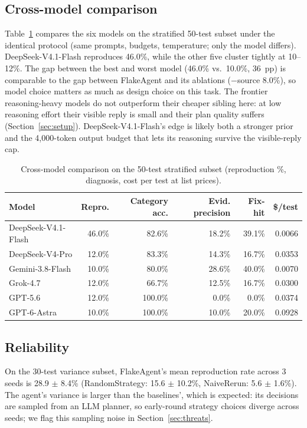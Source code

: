 \subsection{Cross-model comparison}

Table~\ref{tab:models-results} compares the six models on the stratified
50-test subset under the identical protocol (same prompts, budgets,
temperature; only the model differs). DeepSeek-V4.1-Flash reproduces 46.0\%,
while the other five cluster tightly at 10--12\%. The gap between the best
and worst model (46.0\% vs.\ 10.0\%, 36~pp) is comparable to the gap between
FlakeAgent and its ablations ($-$source 8.0\%), so model choice matters as
much as design choice on this task. The frontier reasoning-heavy models do
not outperform their cheaper sibling here: at low reasoning effort their
visible reply is small and their plan quality suffers
(Section~\ref{sec:setup}). DeepSeek-V4.1-Flash's edge is likely both a
stronger prior and the 4{,}000-token output budget that lets its reasoning
survive the visible-reply cap.

\begin{table}[t]
\caption{Cross-model comparison on the 50-test stratified subset
(reproduction \%, diagnosis, cost per test at list prices).}
\label{tab:models-results}
\small
\begin{tabular}{@{}lrrrrr@{}}
\toprule
\textbf{Model} & \textbf{Repro.} & \textbf{Category acc.} &
\textbf{Evid. precision} & \textbf{Fix-hit} & \textbf{\$/test}\\
\midrule
DeepSeek-V4.1-Flash & 46.0\% & 82.6\% & 18.2\% & 39.1\% & 0.0066\\
DeepSeek-V4-Pro & 12.0\% & 83.3\% & 14.3\% & 16.7\% & 0.0353\\
Gemini-3.8-Flash & 10.0\% & 80.0\% & 28.6\% & 40.0\% & 0.0070\\
Grok-4.7 & 12.0\% & 66.7\% & 12.5\% & 16.7\% & 0.0300\\
GPT-5.6 & 12.0\% & 100.0\% & 0.0\% & 0.0\% & 0.0374\\
GPT-6-Astra & 10.0\% & 100.0\% & 10.0\% & 20.0\% & 0.0928\\
\bottomrule
\end{tabular}
\end{table}

\subsection{Reliability}

On the 30-test variance subset, FlakeAgent's mean reproduction rate across 3
seeds is 28.9 $\pm$ 8.4\% (RandomStrategy: 15.6 $\pm$ 10.2\%, NaiveRerun:
5.6 $\pm$ 1.6\%). The agent's variance is larger than the baselines', which
is expected: its decisions are sampled from an LLM planner, so early-round
strategy choices diverge across seeds; we flag this sampling noise in
Section~\ref{sec:threats}.
